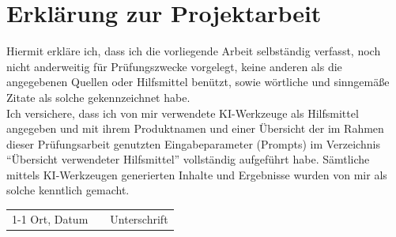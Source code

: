 \thispagestyle{empty}
\section*{Erklärung zur Projektarbeit}
\vspace{10mm}
Hiermit erkläre ich, dass ich die vorliegende Arbeit selbständig verfasst, noch nicht anderweitig für Prüfungszwecke vorgelegt, keine anderen als die angegebenen Quellen oder Hilfsmittel benützt, sowie wörtliche und sinngemäße Zitate als solche gekennzeichnet habe.\\

\noindent Ich versichere, dass ich von mir verwendete KI-Werkzeuge als Hilfsmittel angegeben und mit ihrem Produktnamen und einer Übersicht der im Rahmen dieser Prüfungsarbeit genutzten Eingabeparameter (Prompts) im Verzeichnis "`Übersicht verwendeter Hilfsmittel"' vollständig aufgeführt habe. Sämtliche mittels KI-Werkzeugen generierten Inhalte und Ergebnisse wurden von mir als solche kenntlich gemacht.

\vspace{30mm}
\noindent\begin{tabular}{@{}p{5cm}p{2cm}p{6cm}@{}}
    \cline{1-1} \cline{3-3}
    Ort, Datum & & Unterschrift
\end{tabular}
